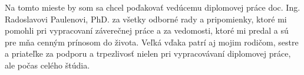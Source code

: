 Na tomto mieste by som sa chcel poďakovať vedúcemu diplomovej práce doc. Ing. Radoslavovi Paulenovi, PhD. za všetky odborné rady a pripomienky, ktoré mi pomohli pri vypracovaní záverečnej práce a za vedomosti, ktoré mi predal a sú pre mňa cenným prínosom do života. Veľká vďaka patrí aj mojim rodičom, sestre a priateľke za podporu a trpezlivosť nielen pri vypracovávaní diplomovej práce, ale počas celého štúdia.